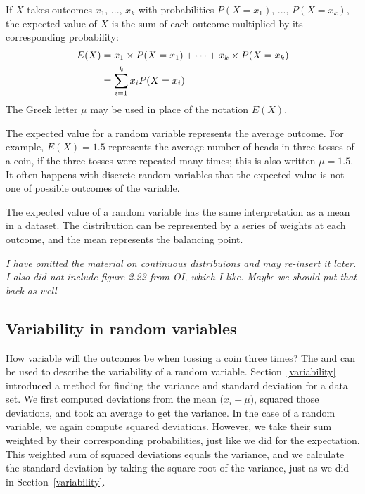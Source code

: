 \begin{doublespace}
\begin{termBox}{
If $X$ takes outcomes $x_1$, ..., $x_k$ with probabilities $P(X=x_1)$, ..., $P(X=x_k)$, the expected value of $X$ is the sum of each outcome multiplied by its corresponding probability:
\begin{align}
E(X) 	&= x_1\times P(X=x_1) + \cdots + x_k\times P(X=x_k) \notag \\
	&= \sum_{i=1}^{k}x_iP(X=x_i)
\end{align}
The Greek letter $\mu$ may be used in place of the notation $E(X)$.}
\end{termBox}
The expected value for a random variable represents the average outcome. For example, $E(X)=1.5$ represents the average number of heads in three tosses of a coin, if the three tosses were repeated many times; this is also written $\mu=1.5$.  It often happens with discrete random variables that the expected value is not one of possible outcomes of the variable.

The expected value of a random variable has the same interpretation as a mean in a dataset.  The distribution can be represented by a series of weights at each outcome, and the mean represents the balancing point.

\textit{I have omitted the material on continuous distribuions and may re-insert it later.  I also did not include figure 2.22 from OI, which I like.  Maybe we should put that back as well }


\subsection{Variability in random variables}

How variable will the outcomes be when tossing a coin three times?  The  and  can be used to describe the variability of a random variable. Section~\ref{variability}
introduced a method for finding the variance and standard deviation for a data set. We first computed deviations from the mean ($x_i - \mu$), squared those deviations, and took an average to get the variance. In the case of a random variable, we again compute squared deviations. However, we take their sum weighted by their corresponding probabilities, just like we did for the expectation. This weighted sum of squared deviations equals the variance, and we calculate the standard deviation by taking the square root of the variance, just as we did in Section~\ref{variability}.


\end{doublespace}

